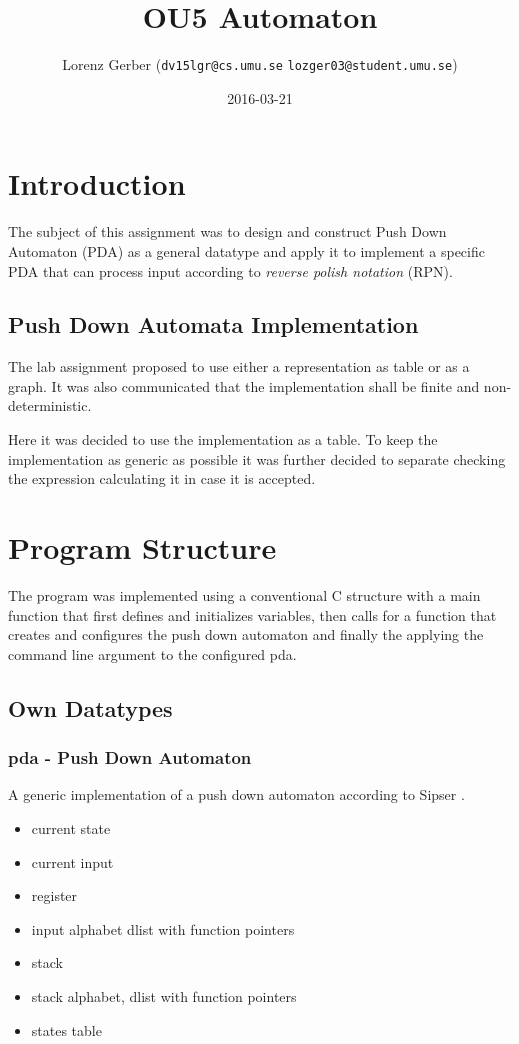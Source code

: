 \documentclass[a4paper,11pt,twoside]{article}
\title{OU5 Automaton}
\author{Lorenz Gerber ({\tt{dv15lgr@cs.umu.se}} {\tt{lozger03@student.umu.se}})}
\date{2016-03-21}
\begin{document}
\lstset{language=C}
\maketitle
\thispagestyle{empty}
\newpage
\tableofcontents
\thispagestyle{empty}
\newpage

\clearpage
{}

\section{Introduction} 
The subject of this assignment was to design and construct Push Down
Automaton (PDA) as a general datatype and apply it to implement a
specific PDA that can process input according to \textit{reverse
  polish notation} (RPN). 

\subsection{Push Down Automata Implementation}
The lab assignment proposed to use either a representation as table or
as a graph. It was also communicated that the implementation shall be
finite and non-deterministic.

Here it was decided to use the implementation as a table. To keep the
implementation as generic as possible it was further decided to
separate checking the expression calculating it in case it is
accepted.

\section{Program Structure}
The program was implemented using a conventional C structure with a
main function that first defines and initializes variables, then calls 
for a function that creates and configures the push down
automaton and finally the applying the command line argument to the
configured pda.

\subsection{Own Datatypes}

\subsubsection{pda - Push Down Automaton}
A generic implementation of a push down automaton according to Sipser
\cite[pp 112-125]{sipser2012}.

\begin{itemize}
\item current state
\item current input
\item register
\item input alphabet dlist with function pointers
\item stack
\item stack alphabet, dlist with function pointers
\item states table
\end{itemize}
\end{document}
